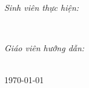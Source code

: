 \begin{titlepage}
    \begin{minipage}[t]{0.5\textwidth}
    \begin{flushleft} \large
    \emph{Sinh viên thực hiện:}\\
    \studentname
    \end{flushleft}
    \end{minipage}
    ~
    \begin{minipage}[t]{0.4\textwidth}
    \begin{flushright} \large
    \emph{Giáo viên hướng dẫn:} \\
    \teachername
    \end{flushright}
    \end{minipage}\\[1cm]
    
    {\large \today}\\[1cm]
    
    \vfill
    \end{titlepage}
    